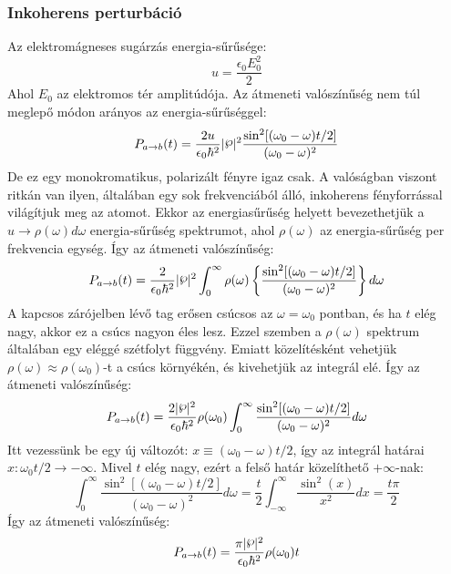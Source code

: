 \documentclass[../main.tex]{subfiles}
\begin{document}
\subsubsection{Inkoherens perturbáció}
Az elektromágneses sugárzás energia-sűrűsége:
\begin{equation}
    u = \frac{\epsilon_0 E_0^2}{2}
\end{equation}
Ahol $E_0$ az elektromos tér amplitúdója. Az átmeneti valószínűség nem túl meglepő módon arányos az energia-sűrűséggel:
\begin{equation}
    P_{a \to b} (t) = \frac{2u}{\epsilon_0 \hbar^2} |\pw|^2 \frac{\sin^2 [(\omega_0 - \omega)t/2]}{(\omega_0 - \omega)^2}
\end{equation}
De ez egy monokromatikus, polarizált fényre igaz csak. A valóságban viszont ritkán van ilyen, általában egy sok frekvenciából álló, inkoherens fényforrással világítjuk meg az atomot.
Ekkor az energiasűrűség helyett bevezethetjük a $u \to \rho(\omega) d\omega$ energia-sűrűség spektrumot, ahol $\rho(\omega)$ az energia-sűrűség per frekvencia egység. Így az átmeneti valószínűség:
\begin{equation}
    P_{a \to b} (t) = \frac{2}{\epsilon_0 \hbar^2} |\pw|^2 \int_{0}^{\infty} \rho(\omega) \left\{\frac{\sin^2 [(\omega_0 - \omega)t/2]}{(\omega_0 - \omega)^2}\right\} d\omega
\end{equation}
A kapcsos zárójelben lévő tag erősen csúcsos az $\omega = \omega_0$ pontban, és ha $t$ elég nagy, akkor ez a csúcs nagyon éles lesz. Ezzel szemben a $\rho(\omega)$ spektrum általában egy eléggé szétfolyt függvény.
Emiatt közelítésként vehetjük $\rho(\omega) \approx \rho(\omega_0)$-t a csúcs környékén, és kivehetjük az integrál elé. Így az átmeneti valószínűség:
\begin{equation}
    P_{a \to b} (t) = \frac{2 |\pw|^2}{\epsilon_0 \hbar^2} \rho(\omega_0) \int_{0}^{\infty} \frac{\sin^2 [(\omega_0 - \omega)t/2]}{(\omega_0 - \omega)^2} d\omega
\end{equation}
Itt vezessünk be egy új változót: $x \equiv (\omega_0 - \omega)t/2$, így az integrál határai $x: \omega_0 t/2 \to -\infty$. Mivel $t$ elég nagy, ezért a felső határ közelíthető $+\infty$-nak:
\begin{equation}
    \int_{0}^{\infty} \frac{\sin^2 [(\omega_0 - \omega)t/2]}{(\omega_0 - \omega)^2} d\omega = \frac{t}{2} \int_{-\infty}^{\infty} \frac{\sin^2 (x)}{x^2} dx = \frac{t \pi}{2}
\end{equation}
Így az átmeneti valószínűség:
\begin{equation}
    P_{a \to b} (t) = \frac{\pi |\pw|^2}{\epsilon_0 \hbar^2} \rho(\omega_0) t
\end{equation}
\end{document}
